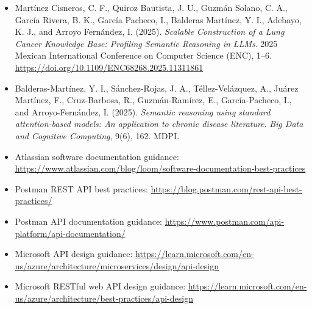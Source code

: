 \documentclass[10pt,letterpaper]{article}
\begin{document}
\begin{itemize}
\item Mart\'inez Cisneros, C. F., Quiroz Bautista, J. U., Guzm\'an Solano, C. A., Garc\'ia Rivera, B. K., Garc\'ia Pacheco, I., Balderas Mart\'inez, Y. I., Adebayo, K. J., and Arroyo Fern\'andez, I. (2025). \textit{Scalable Construction of a Lung Cancer Knowledge Base: Profiling Semantic Reasoning in LLMs}. 2025 Mexican International Conference on Computer Science (ENC), 1--6. \url{https://doi.org/10.1109/ENC68268.2025.11311861}
\item Balderas-Mart\'inez, Y. I., S\'anchez-Rojas, J. A., T\'ellez-Vel\'azquez, A., Ju\'arez Mart\'inez, F., Cruz-Barbosa, R., Guzm\'an-Ram\'irez, E., Garc\'ia-Pacheco, I., and Arroyo-Fern\'andez, I. (2025). \textit{Semantic reasoning using standard attention-based models: An application to chronic disease literature}. \textit{Big Data and Cognitive Computing}, 9(6), 162. MDPI.
\item Atlassian software documentation guidance: \url{https://www.atlassian.com/blog/loom/software-documentation-best-practices}
\item Postman REST API best practices: \url{https://blog.postman.com/rest-api-best-practices/}
\item Postman API documentation guidance: \url{https://www.postman.com/api-platform/api-documentation/}
\item Microsoft API design guidance: \url{https://learn.microsoft.com/en-us/azure/architecture/microservices/design/api-design}
\item Microsoft RESTful web API design guidance: \url{https://learn.microsoft.com/en-us/azure/architecture/best-practices/api-design}
\end{itemize}
\end{document}

